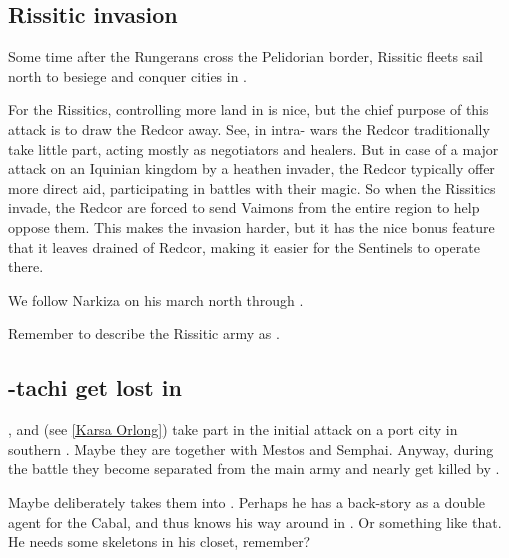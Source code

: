 \subsection{Rissitic invasion}
Some time after the Rungerans cross the Pelidorian border, Rissitic fleets sail north to besiege and conquer cities in \Scyrum. 


For the Rissitics, controlling more land in \Velcad{} is nice, but the chief purpose of this attack is to draw the Redcor away. See, in intra-\Velcadian{} wars the Redcor traditionally take little part, acting mostly as negotiators and healers. But in case of a major attack on an Iquinian kingdom by a heathen invader, the Redcor typically offer more direct aid, participating in battles with their magic. So when the Rissitics invade, the Redcor are forced to send Vaimons from the entire region to help oppose them. 
This makes the invasion harder, but it has the nice bonus feature that it leaves \Malcur drained of Redcor, making it easier for the Sentinels to operate there. 

We follow Narkiza on his march north through \Scyrum. 



Remember to describe the Rissitic army as .







\subsection{\Shilred-tachi get lost in \Nyx}
\Shilred{}, \Dzasselid{} and \KarsaOrlong{} (see \ref{Karsa Orlong}) take part in the initial attack on a port city in southern \Scyrum. Maybe they are together with Mestos and Semphai. Anyway, during the battle they become separated from the main army and nearly get killed by \banes. %

Maybe \Dzasselid{} deliberately takes them into \Nyx. Perhaps he has a back-story as a double agent for the Cabal, and thus knows his way around in \Nyx. Or something like that. He needs some skeletons in his closet, remember?

